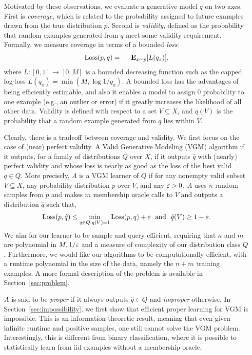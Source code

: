 Motivated by these observations, we evaluate a generative model $q$ on two axes. First is {\em coverage}, which is related to the probability assigned to future examples drawn from the true distribution $p$. Second is {\em validity}, defined as the probability that random examples generated from $q$ meet some validity requirement. Formally, we measure coverage in terms of a bounded {\em loss}:
$$\Loss(p,q)=\E_{x \sim p}[L(q_x)],$$
where $L:[0,1]\rightarrow [0,M]$ is a bounded decreasing function such as the capped log-loss $L(q_x)=\min(M, \log 1/q_x)$. %
A bounded loss has the advantages of being efficiently estimable, and also it enables a model to assign 0 probability to one example (e.g., an outlier or error) if it greatly increases the likelihood of all other data. Validity is defined with respect to a set $V \subseteq X$, and $q(V)$ is the probability that a random example generated from $q$ lies within $V$. 

Clearly, there is a tradeoff between coverage and validity. We first focus on the case of (near) perfect validity. A Valid Generative Modeling (VGM) algorithm if it outputs, for a family of distributions $Q$ over $X$, if it outputs $\hat{q}$ with (nearly) perfect validity and whose loss is nearly as good as the loss of the best valid $q\in Q$. More precisely, $A$ is a VGM learner of $Q$ if for any nonempty valid subset $V \subseteq X$, any probability distribution $p$ over $V$, and any $\varepsilon>0$, $A$ uses $n$ random samples from $p$ and makes $m$ membership oracle calls to $V$ and outputs a distribution $\hat{q}$ such that, $$\text{Loss}(p, \hat{q}) \leq \min_{q \in Q: q(V)=1}\text{Loss}(p,q) + \varepsilon ~\text{ and }~\hat{q}(V)\geq 1-\varepsilon.$$ 
We aim for our learner to be sample and query efficient, requiring that $n$ and $m$ are polynomial in $M, 1/\varepsilon$ and a measure of complexity of our distribution class $Q$.
Furthermore, we would like our algorithms to be computationally efficient, with a runtime polynomial in the size of the data, namely the $n + m$ training examples. 
A more formal description of the problem is available in Section~\ref{sec:problem}.

$A$ is said to be {\em proper} if it always outputs $\hat{q}\in Q$ and {\em improper} otherwise.
In Section~\ref{sec:impossibility}, we first show that efficient proper learning for VGM is impossible. This is an information-theoretic result, meaning that even given infinite runtime and positive samples, one still cannot solve the VGM problem. Interestingly, this is different from binary classification, where it is possible to statistically learn from iid examples without a membership oracle.


